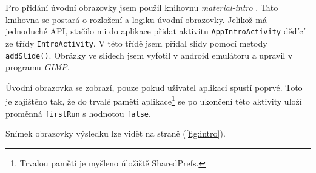 \documentclass[../TakeYourPill.tex]{subfiles}
\begin{document}
Pro přidání úvodní obrazovky jsem použil knihovnu \textit{material-intro} \cite{intro}. Tato knihovna se postará o rozložení a logiku úvodní obrazovky. Jelikož má jednoduché API, stačilo mi do aplikace přidat aktivitu \texttt{AppIntroActivity} dědící ze třídy \texttt{IntroActivity}. V této třídě jsem přidal slidy pomocí metody \texttt{addSlide()}. Obrázky ve slidech jsem vyfotil v android emulátoru a upravil v programu \textit{GIMP}.

Úvodní obrazovka se zobrazí, pouze pokud uživatel aplikaci spustí poprvé. Toto je zajištěno tak, že do trvalé paměti aplikace\footnote{Trvalou pamětí je myšleno úložiště SharedPrefs.} se po ukončení této aktivity uloží proměnná \texttt{firstRun} s hodnotou \texttt{false}.

Snímek obrazovky výsledku lze vidět na straně \pageref{fig:intro} (\ref{fig:intro}).
\end{document}
